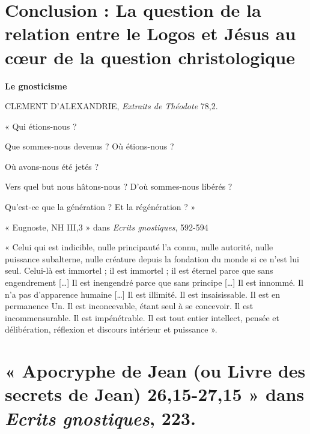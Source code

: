     
  


\hypertarget{conclusion-la-question-de-la-relation-entre-le-logos-et-juxe9sus-au-cux153ur-de-la-question-christologique}{%
\section{Conclusion : La question de la relation entre le Logos et
Jésus au cœur de la question
christologique}\label{conclusion-la-question-de-la-relation-entre-le-logos-et-juxe9sus-au-cux153ur-de-la-question-christologique}}



\textbf{Le gnosticisme}

CLEMENT D'ALEXANDRIE, \emph{Extraits de Théodote} 78,2.

« Qui étions-nous ?

Que sommes-nous devenus ? Où étions-nous ?

Où avons-nous été jetés ?

Vers quel but nous hâtons-nous ? D'où sommes-nous libérés ?

Qu'est-ce que la génération ? Et la régénération ? »

« Eugnoste, NH III,3 » dans \emph{Ecrits gnostiques}, 592-594

« Celui qui est indicible, nulle principauté l'a connu, nulle autorité,
nulle puissance subalterne, nulle créature depuis la fondation du monde
si ce n'est lui seul. Celui-là est immortel ; il est immortel ; il est
éternel parce que sans engendrement {[}\ldots{]} Il est inengendré parce
que sans principe {[}\ldots{]} Il est innommé. Il n'a pas d'apparence
humaine {[}\ldots{]} Il est illimité. Il est insaisissable. Il est en
permanence Un. Il est inconcevable, étant seul à se concevoir. Il est
incommensurable. Il est impénétrable. Il est tout entier intellect,
pensée et délibération, réflexion et discours intérieur et puissance ».


\hypertarget{apocryphe-de-jean-ou-livre-des-secrets-de-jean-2615-2715-dans-ecrits-gnostiques-223.}{%
\section{\texorpdfstring{« Apocryphe de Jean (ou Livre des secrets de
Jean) 26,15-27,15 » dans \emph{Ecrits gnostiques},
223.}{« Apocryphe de Jean (ou Livre des secrets de Jean) 26,15-27,15 » dans Ecrits gnostiques, 223.}}\label{apocryphe-de-jean-ou-livre-des-secrets-de-jean-2615-2715-dans-ecrits-gnostiques-223.}}


